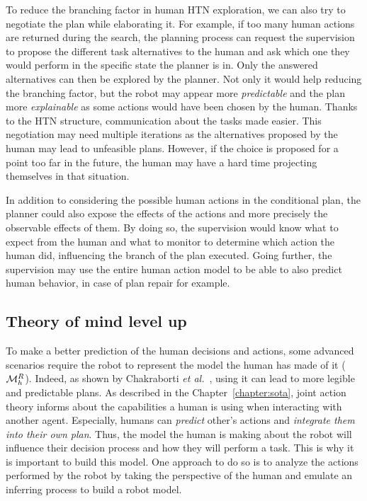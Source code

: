 \documentclass[a4paper,11pt,twoside]{StyleThese}
\begin{document}
To reduce the branching factor in human HTN exploration, we can also try to negotiate the plan while elaborating it. For example, if too many human actions are returned during the search, the planning process can request the supervision to propose the different task alternatives to the human and ask which one they would perform in the specific state the planner is in. Only the answered alternatives can then be explored by the planner. Not only it would help reducing the branching factor, but the robot may appear more \textit{predictable} and the plan more \textit{explainable} as some actions would have been chosen by the human. Thanks to the HTN structure, communication about the tasks made easier. This negotiation may need multiple iterations as the alternatives proposed by the human may lead to unfeasible plans. However, if the choice is proposed for a point too far in the future, the human may have a hard time projecting themselves in that situation.

In addition to considering the possible human actions in the conditional plan, the planner could also expose the effects of the actions and more precisely the observable effects of them. By doing so, the supervision would know what to expect from the human and what to monitor to determine which action the human did, influencing the branch of the plan executed. Going further, the supervision may use the entire human action model to be able to also predict human behavior, in case of plan repair for example.

\subsection*{Theory of mind level up}
To make a better prediction of the human decisions and actions, some advanced scenarios require the robot to represent the model the human has made of it ($\mathcal{M}^R_h$). Indeed, as shown by Chakraborti \textit{et al.}~\cite{chakraborti2017plan}, using it can lead to more legible and predictable plans. As described in the Chapter~\ref{chapter:sota}, joint action theory informs about the capabilities a human is using when interacting with another agent. Especially, humans can \textit{predict} other's actions and \textit{integrate them into their own plan}. Thus, the model the human is making about the robot will influence their decision process and how they will perform a task. This is why it is important to build this model. One approach to do so is to analyze the actions performed by the robot by taking the perspective of the human and emulate an inferring process to build a robot model.
\end{document}
